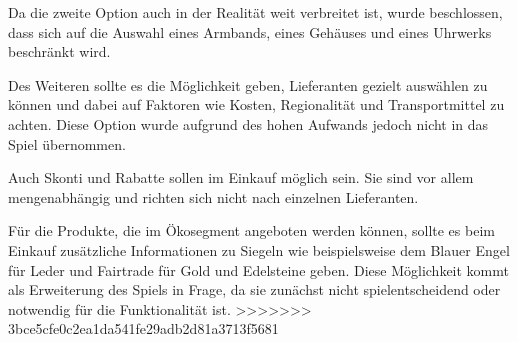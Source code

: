 Da die zweite Option auch in der Realität weit verbreitet ist, wurde beschlossen, dass sich auf die Auswahl eines Armbands, eines Gehäuses und eines Uhrwerks beschränkt wird.

Des Weiteren sollte es die Möglichkeit geben, Lieferanten gezielt auswählen zu können und dabei auf Faktoren wie Kosten, Regionalität und Transportmittel zu achten.
Diese Option wurde aufgrund des hohen Aufwands jedoch nicht in das Spiel übernommen.

Auch Skonti und Rabatte sollen im Einkauf möglich sein. Sie sind vor allem mengenabhängig und richten sich nicht nach einzelnen Lieferanten.

Für die Produkte, die im Ökosegment angeboten werden können, sollte es beim Einkauf zusätzliche Informationen zu Siegeln wie beispielsweise dem Blauer Engel für Leder und Fairtrade für Gold und Edelsteine geben.
Diese Möglichkeit kommt als Erweiterung des Spiels in Frage, da sie zunächst nicht spielentscheidend oder notwendig für die Funktionalität ist.
>>>>>>> 3bce5cfe0c2ea1da541fe29adb2d81a3713f5681
